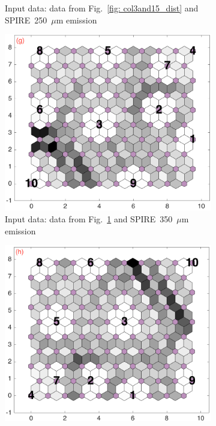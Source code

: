 \begin{figure}
\begin{subfigure}[b]{0.25\textwidth}
        \caption{Input data: data from Fig.~\ref{fig: col3and15_dist} and SPIRE~250~$\mu$m emission }
        \label{fig: col3and16_dist}
    \end{subfigure}
        \hfill
    \begin{subfigure}[b]{0.25\textwidth}
        \centering
        \includegraphics[width=\textwidth]{../../images0.01/M31/2D/diff_dimension/combine_2D_data_between_cols3and17.png}
        \caption{Input data: data from Fig.~\ref{fig: col3and16_dist} and SPIRE~350~$\mu$m emission }
        \label{fig: col3and17_dist}
    \end{subfigure}
        \hfill
    \begin{subfigure}[b]{0.25\textwidth}
        \centering
        \includegraphics[width=\textwidth]{../../images0.01/M31/2D/diff_dimension/combine_2D_data_between_cols3and18.png}

\end{subfigure}
\end{figure}
